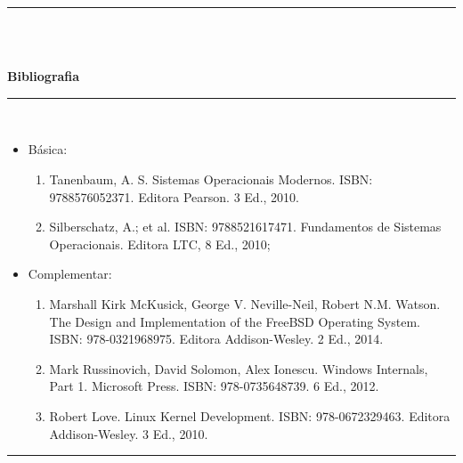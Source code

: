 \noindent\rule{16.5cm}{0.4pt}\\
\\
\vspace{-12mm}
\begin{center}\textbf{Bibliografia}\end{center}
\vspace{-5mm}
\noindent\rule{16.5cm}{0.4pt}
\\
\begin{itemize} 
  \item Básica:
	\begin{enumerate}
	\item Tanenbaum, A. S. Sistemas Operacionais Modernos. ISBN: 9788576052371. Editora Pearson. 3 Ed., 2010. 
	\item Silberschatz, A.; et al. ISBN: 9788521617471. Fundamentos de Sistemas Operacionais. Editora LTC, 8 Ed., 2010; 
	\end{enumerate}
  \item Complementar:
	\begin{enumerate} 
	\item Marshall Kirk McKusick, George V. Neville-Neil, Robert N.M. Watson. The Design and Implementation of the FreeBSD Operating System. ISBN: 978-0321968975. Editora Addison-Wesley. 2 Ed., 2014.
	\item Mark Russinovich, David Solomon, Alex Ionescu. Windows Internals, Part 1. Microsoft Press. ISBN: 978-0735648739. 6 Ed., 2012.
	\item Robert Love. Linux Kernel Development. ISBN: 978-0672329463. Editora Addison-Wesley. 3 Ed., 2010.
	\end{enumerate}
\end{itemize}
\noindent\rule{16.5cm}{0.4pt}\\
\\
